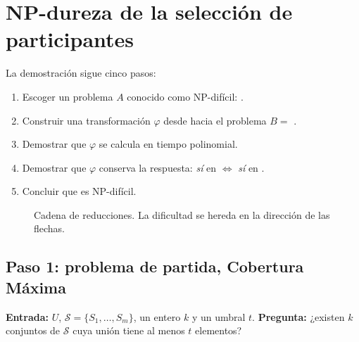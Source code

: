 \section{NP-dureza de la selección de participantes}\label{sec:reduccion}

La demostración sigue cinco pasos:
\begin{enumerate}
  \item Escoger un problema $A$ conocido como NP-difícil: \MC.
  \item Construir una transformación $\varphi$ desde \MC{} hacia el problema $B=$ \SEL.
  \item Demostrar que $\varphi$ se calcula en tiempo polinomial.
  \item Demostrar que $\varphi$ conserva la respuesta: \emph{sí} en \MC{} $\iff$ \emph{sí} en \SEL.
  \item Concluir que \SEL{} es NP-difícil.
\end{enumerate}

\begin{figure}[H]
\centering
{}
\caption{Cadena de reducciones. La dificultad se hereda en la dirección de las flechas.}
\end{figure}

\subsection{Paso 1: problema de partida, Cobertura Máxima}


\begin{definicion}[\MC]
\textbf{Entrada:} $U$, $\mathcal S=\{S_1,\dots,S_m\}$, un entero $k$ y un umbral $t$. \textbf{Pregunta:} ¿existen $k$ conjuntos de $\mathcal S$ cuya unión tiene al menos $t$ elementos?
\end{definicion}

